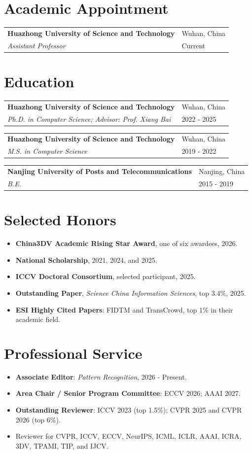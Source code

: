 \documentclass[a4paper,11pt]{article}
\makeatletter
\newcommand{\timeline}[4]{%
  \begin{tabularx}{\textwidth}{@{}>{\raggedright\arraybackslash}X>{\raggedleft\arraybackslash}p{3.25cm}@{}}
    \textbf{#1} & \textcolor{muted}{#2} \\
    \textit{#3} & \textcolor{muted}{#4}
  \end{tabularx}\vspace{0.7em}
}
\makeatother
\begin{document}
\section{Academic Appointment}
\timeline{Huazhong University of Science and Technology}{Wuhan, China}
         {Assistant Professor}{Current}

\section{Education}
\timeline{Huazhong University of Science and Technology}{Wuhan, China}
         {Ph.D. in Computer Science; Advisor: Prof. Xiang Bai}{2022 - 2025}
\timeline{Huazhong University of Science and Technology}{Wuhan, China}
         {M.S. in Computer Science}{2019 - 2022}
\timeline{Nanjing University of Posts and Telecommunications}{Nanjing, China}
         {B.E.}{2015 - 2019}

\section{Selected Honors}
\begin{itemize}[leftmargin=1.35em,itemsep=0.52em,topsep=0.1em]
  \item \textbf{China3DV Academic Rising Star Award}, one of six awardees, 2026.
  \item \textbf{National Scholarship}, 2021, 2024, and 2025.
  \item \textbf{ICCV Doctoral Consortium}, selected participant, 2025.
  \item \textbf{Outstanding Paper}, \textit{Science China Information Sciences}, top 3.4\%, 2025.
  \item \textbf{ESI Highly Cited Papers}: FIDTM and TransCrowd, top 1\% in their academic field.
\end{itemize}

\section{Professional Service}
\begin{itemize}[leftmargin=1.35em,itemsep=0.52em,topsep=0.1em]
  \item \textbf{Associate Editor}: \textit{Pattern Recognition}, 2026 - Present.
  \item \textbf{Area Chair / Senior Program Committee}: ECCV 2026; AAAI 2027.
  \item \textbf{Outstanding Reviewer}: ICCV 2023 (top 1.5\%); CVPR 2025 and CVPR 2026 (top 6\%).
  \item Reviewer for CVPR, ICCV, ECCV, NeurIPS, ICML, ICLR, AAAI, ICRA, 3DV, TPAMI, TIP, and IJCV.
\end{itemize}
\end{document}
